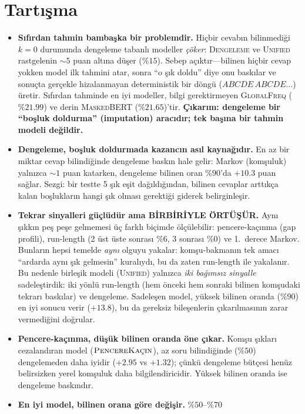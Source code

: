 \documentclass[11pt]{article}
\begin{document}
\section{Tartışma}
\begin{itemize}
  \item \textbf{Sıfırdan tahmin bambaşka bir problemdir.} Hiçbir cevabın
  bilinmediği $k=0$ durumunda dengeleme tabanlı modeller \emph{çöker}:
  \textsc{Dengeleme} ve \textsc{Unified} rastgelenin $\sim 5$ puan altına düşer
  ($\%15$). Sebep açıktır---bilinen hiçbir cevap yokken model ilk tahmini atar,
  sonra ``o şık doldu'' diye onu baskılar ve sonuçta gerçekle hizalanmayan
  deterministik bir döngü ($ABCDE\,ABCDE\ldots$) üretir. Sıfırdan tahminde en
  iyi modeller, bilgi gerektirmeyen \textsc{GlobalFreq} ($\%21.99$) ve derin
  \textsc{MaskedBERT} ($\%21.65$)'tir. \textbf{Çıkarım: dengeleme bir
  ``boşluk doldurma'' (imputation) aracıdır; tek başına bir tahmin modeli
  değildir.}
  \item \textbf{Dengeleme, boşluk doldurmada kazancın asıl kaynağıdır.} En az
  bir miktar cevap bilindiğinde dengeleme baskın hale gelir: Markov (komşuluk)
  yalnızca $\sim 1$ puan katarken, dengeleme bilinen oran $\%90$'da $+10.3$
  puan sağlar. Sezgi: bir testte 5 şık eşit dağıldığından, bilinen cevaplar
  arttıkça kalan boşlukların hangi şık olması gerektiği giderek belirginleşir.
  \item \textbf{Tekrar sinyalleri güçlüdür ama BİRBİRİYLE ÖRTÜŞÜR.} Aynı
  şıkkın peş peşe gelmemesi üç farklı biçimde ölçülebilir: pencere-kaçınma
  (gap profili), run-length (2 üst üste sonrası $\%6$, 3 sonrası $\%0$) ve
  1.\ derece Markov. Bunların hepsi temelde \emph{aynı} olguyu yakalar:
  komşu-bakmanın tek amacı ``ardarda aynı şık gelmesin'' kuralıydı, bu da
  zaten run-length ile yakalanır. Bu nedenle birleşik modeli (\textsc{Unified})
  yalnızca \emph{iki bağımsız sinyalle} sadeleştirdik: iki yönlü run-length
  (hem önceki hem sonraki bilinen komşudaki tekrarı baskılar) ve dengeleme.
  Sadeleşen model, yüksek bilinen oranda ($\%90$) en iyi sonucu verir
  ($+13.8$), bu da gereksiz bileşenlerin çıkarılmasının zarar vermediğini
  doğrular.
  \item \textbf{Pencere-kaçınma, düşük bilinen oranda öne çıkar.} Komşu
  şıkları cezalandıran model ($\textsc{PencereKaçın}$), az soru bilindiğinde
  ($\%50$) dengelemeden daha iyidir ($+2.95$ vs $+1.32$); çünkü dengeleme
  bütçesi henüz belirsizken yerel komşuluk daha bilgilendiricidir. Yüksek
  bilinen oranda ise dengeleme baskındır.
  \item \textbf{En iyi model, bilinen orana göre değişir.} $\%50$--$\%70$

\end{itemize}
\end{document}
